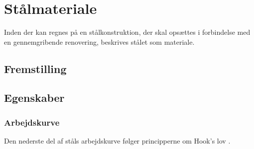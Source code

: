 \chapter{Stålmateriale}

Inden der kan regnes på en stålkonstruktion, der skal opsættes i forbindelse med en gennemgribende renovering, beskrives stålet som materiale.

\section{Fremstilling}

\section{Egenskaber}


\subsection{Arbejdskurve}

Den nederste del af ståls arbejdskurve følger principperne om Hook's lov \citep[ s. 419]{fysikbog}.